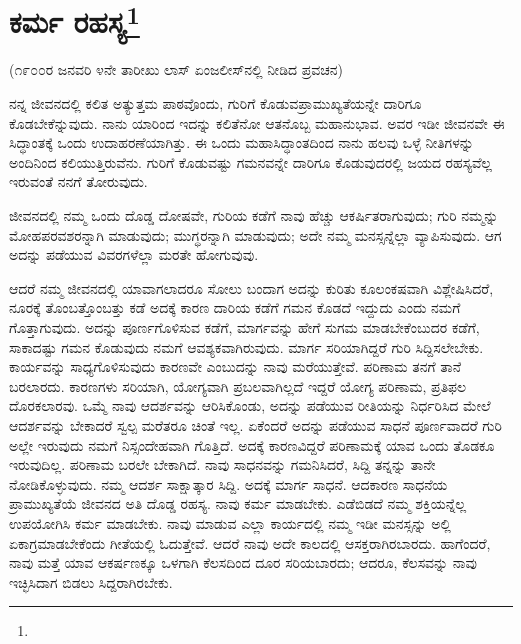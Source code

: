 
\chapter[ಕರ್ಮ ರಹಸ್ಯ]{ಕರ್ಮ ರಹಸ್ಯ\protect\footnote{}}

\begin{center}
(೧೯೦೦ರ ಜನವರಿ ೪ನೇ ತಾರೀಖು ಲಾಸ್ ಏಂಜಲೀಸ್‌ನಲ್ಲಿ ನೀಡಿದ ಪ್ರವಚನ)
\end{center}

ನನ್ನ ಜೀವನದಲ್ಲಿ ಕಲಿತ ಅತ್ಯುತ್ತಮ ಪಾಠವೊಂದು, ಗುರಿಗೆ ಕೊಡುವ\break ಪ್ರಾಮುಖ್ಯತೆಯನ್ನೇ ದಾರಿಗೂ ಕೊಡಬೇಕೆನ್ನುವುದು. ನಾನು ಯಾರಿಂದ ಇದನ್ನು ಕಲಿತೆನೋ ಆತನೊಬ್ಬ ಮಹಾನುಭಾವ. ಅವರ ಇಡೀ ಜೀವನವೇ ಈ ಸಿದ್ಧಾಂತಕ್ಕೆ ಒಂದು ಉದಾಹರಣೆಯಾಗಿತ್ತು. ಈ ಒಂದು ಮಹಾಸಿದ್ಧಾಂತದಿಂದ ನಾನು ಹಲವು ಒಳ್ಳೆ ನೀತಿಗಳನ್ನು ಅಂದಿನಿಂದ ಕಲಿಯುತ್ತಿರುವೆನು. ಗುರಿಗೆ ಕೊಡುವಷ್ಟು ಗಮನವನ್ನೇ ದಾರಿಗೂ ಕೊಡುವುದರಲ್ಲಿ ಜಯದ ರಹಸ್ಯವೆಲ್ಲ ಇರುವಂತೆ ನನಗೆ ತೋರುವುದು.

ಜೀವನದಲ್ಲಿ ನಮ್ಮ ಒಂದು ದೊಡ್ಡ ದೋಷವೇ, ಗುರಿಯ ಕಡೆಗೆ ನಾವು ಹೆಚ್ಚು ಆಕರ್ಷಿತರಾಗುವುದು; ಗುರಿ ನಮ್ಮನ್ನು ಮೋಹಪರವಶರನ್ನಾಗಿ ಮಾಡುವುದು; ಮುಗ್ಧರನ್ನಾಗಿ ಮಾಡುವುದು; ಅದೇ ನಮ್ಮ ಮನಸ್ಸನ್ನೆಲ್ಲಾ ವ್ಯಾಪಿಸುವುದು. ಆಗ ಅದನ್ನು ಪಡೆಯುವ ವಿವರಗಳೆಲ್ಲಾ ಮರತೇ ಹೋಗುವುವು.

ಆದರೆ ನಮ್ಮ ಜೀವನದಲ್ಲಿ ಯಾವಾಗಲಾದರೂ ಸೋಲು ಬಂದಾಗ ಅದನ್ನು ಕುರಿತು ಕೂಲಂಕಷವಾಗಿ ವಿಶ್ಲೇಷಿಸಿದರೆ, ನೂರಕ್ಕೆ ತೊಂಬತ್ತೊಂಬತ್ತು ಕಡೆ ಅದಕ್ಕೆ ಕಾರಣ ದಾರಿಯ ಕಡೆಗೆ ಗಮನ ಕೊಡದೆ ಇದ್ದುದು ಎಂದು ನಮಗೆ ಗೊತ್ತಾಗುವುದು. ಅದನ್ನು ಪೂರ್ಣಗೊಳಿಸುವ ಕಡೆಗೆ, ಮಾರ್ಗವನ್ನು ಹೇಗೆ ಸುಗಮ ಮಾಡಬೇಕೆಂಬುದರ ಕಡೆಗೆ, ಸಾಕಾದಷ್ಟು ಗಮನ ಕೊಡುವುದು ನಮಗೆ ಆವಶ್ಯಕವಾಗಿರುವುದು. ಮಾರ್ಗ ಸರಿಯಾಗಿದ್ದರೆ ಗುರಿ ಸಿದ್ದಿಸಲೇಬೇಕು. ಕಾರ್ಯವನ್ನು ಸಾಧ್ಯಗೊಳಿಸುವುದು ಕಾರಣವೇ ಎಂಬುದನ್ನು ನಾವು ಮರೆಯುತ್ತೇವೆ. ಪರಿಣಾಮ ತನಗೆ ತಾನೆ ಬರಲಾರದು. ಕಾರಣಗಳು ಸರಿಯಾಗಿ, ಯೋಗ್ಯವಾಗಿ ಪ್ರಬಲವಾಗಿಲ್ಲದೆ ಇದ್ದರೆ ಯೋಗ್ಯ ಪರಿಣಾಮ, ಪ್ರತಿಫಲ ದೊರಕಲಾರವು. ಒಮ್ಮೆ ನಾವು ಆದರ್ಶವನ್ನು ಆರಿಸಿಕೊಂಡು, ಅದನ್ನು ಪಡೆಯುವ ರೀತಿಯನ್ನು ನಿರ್ಧರಿಸಿದ ಮೇಲೆ ಆದರ್ಶವನ್ನು ಬೇಕಾದರೆ ಸ್ವಲ್ಪ ಮರೆತರೂ ಚಿಂತೆ ಇಲ್ಲ. ಏಕೆಂದರೆ ಅದನ್ನು ಪಡೆಯುವ ಸಾಧನೆ ಪೂರ್ಣವಾದರೆ ಗುರಿ ಅಲ್ಲೇ ಇರುವುದು ನಮಗೆ ನಿಸ್ಸಂದೇಹವಾಗಿ ಗೊತ್ತಿದೆ. ಅದಕ್ಕೆ ಕಾರಣವಿದ್ದರೆ ಪರಿಣಾಮಕ್ಕೆ ಯಾವ ಒಂದು ತೊಡಕೂ ಇರುವುದಿಲ್ಲ. ಪರಿಣಾಮ ಬರಲೇ ಬೇಕಾಗಿದೆ. ನಾವು ಸಾಧನವನ್ನು ಗಮನಿಸಿದರೆ, ಸಿದ್ದಿ ತನ್ನನ್ನು ತಾನೇ ನೋಡಿಕೊಳ್ಳುವುದು. ನಮ್ಮ ಆದರ್ಶ ಸಾಕ್ಷಾತ್ಕಾರ ಸಿದ್ದಿ. ಅದಕ್ಕೆ ಮಾರ್ಗ ಸಾಧನೆ. ಆದಕಾರಣ ಸಾಧನೆಯ ಪ್ರಾಮುಖ್ಯತೆಯೆ ಜೀವನದ ಅತಿ ದೊಡ್ಡ ರಹಸ್ಯ. ನಾವು ಕರ್ಮ ಮಾಡಬೇಕು. ಎಡೆಬಿಡದೆ ನಮ್ಮ ಶಕ್ತಿಯನ್ನೆಲ್ಲ ಉಪಯೋಗಿಸಿ ಕರ್ಮ ಮಾಡಬೇಕು. ನಾವು ಮಾಡುವ ಎಲ್ಲಾ ಕಾರ್ಯದಲ್ಲಿ ನಮ್ಮ ಇಡೀ ಮನಸ್ಸನ್ನು ಅಲ್ಲಿ ಏಕಾಗ್ರಮಾಡಬೇಕೆಂದು ಗೀತೆಯಲ್ಲಿ ಓದುತ್ತೇವೆ. ಆದರೆ ನಾವು ಅದೇ ಕಾಲದಲ್ಲಿ ಆಸಕ್ತರಾಗಿರಬಾರದು. ಹಾಗೆಂದರೆ, ನಾವು ಮತ್ತೆ ಯಾವ ಆಕರ್ಷಣಕ್ಕೂ ಒಳಗಾಗಿ ಕೆಲಸದಿಂದ ದೂರ ಸರಿಯಬಾರದು; ಆದರೂ, ಕೆಲಸವನ್ನು ನಾವು ಇಚ್ಛಿಸಿದಾಗ ಬಿಡಲು ಸಿದ್ದರಾಗಿರಬೇಕು.

